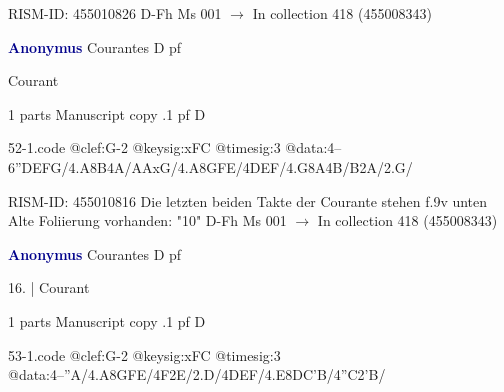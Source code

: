 \documentclass[twocolumn]{book}
\begin{document}
\newline RISM-ID: 455010826
\newline D-Fh  Ms 001
\newline $\rightarrow$ In collection 418 (455008343)

\newline \par \vspace{7pt} \textcolor{darkblue}{\textbf{Anonymus  }}
\newline Courantes  D  
\newline pf
\newline \begin{itshape}[f.10r, at left:] Courant\end{itshape} 
\newline \textcolor{darkblue}{}  1 parts  
\newline Manuscript copy
.1  pf  D  
\begin{filecontents*}{52-1.code}
@clef:G-2
@keysig:xFC
@timesig:3
@data:4--{6''DEFG}/4.A8B4A/AAxG/4.A{8GFE}/4DEF/4.G8A4B/B2A/2.G/
\end{filecontents*}
\newline
%

\newline RISM-ID: 455010816
\newline Die letzten beiden Takte der Courante stehen f.9v unten
\newline Alte Foliierung vorhanden: "10"
\newline D-Fh  Ms 001
\newline $\rightarrow$ In collection 418 (455008343)

\newline \par \vspace{7pt} \textcolor{darkblue}{\textbf{Anonymus  }}
\newline Courantes  D  
\newline pf
\newline \begin{itshape}[f.10v, at left:] 16. | Courant\end{itshape} 
\newline \textcolor{darkblue}{}  1 parts  
\newline Manuscript copy
.1  pf  D  
\begin{filecontents*}{53-1.code}
@clef:G-2
@keysig:xFC
@timesig:3
@data:4--''A/4.A{8GFE}/4F2E/2.D/4DEF/4.E{8DC'B}/4''C2'B/
\end{filecontents*}
\newline
%
\end{document}
